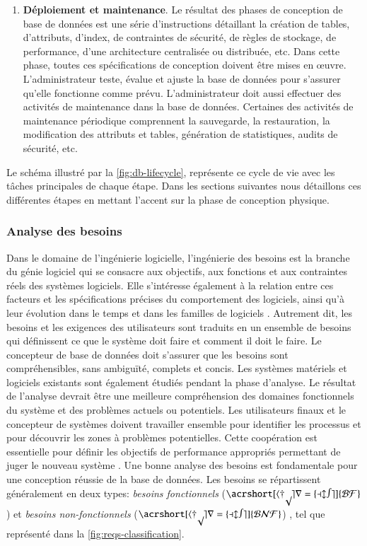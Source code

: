\begin{enumerate}
 \item \textbf{Déploiement et maintenance}. Le résultat des phases de conception de base de données est une série d'instructions détaillant la création de tables, d'attributs, d'index, de contraintes de sécurité, de règles de stockage, de performance, d'une architecture centralisée ou distribuée, etc. Dans cette phase, toutes ces spécifications de conception doivent être mises en œuvre. L'administrateur teste, évalue et ajuste la base de données pour s'assurer qu'elle fonctionne comme prévu. L'administrateur doit aussi effectuer des activités de maintenance dans la base de données. Certaines des activités de maintenance périodique comprennent la sauvegarde, la restauration, la modification des attributs et tables, génération de statistiques, audits de sécurité, etc.
\end{enumerate}

Le schéma illustré par la \ref{fig:db-lifecycle}, représente ce cycle de vie avec les tâches principales de chaque étape. Dans les sections suivantes nous détaillons ces différentes étapes en mettant l'accent sur la phase de conception physique.

\subsubsection{Analyse des besoins}
Dans le domaine de l'ingénierie logicielle, l'ingénierie des besoins est la branche du génie logiciel qui se consacre aux objectifs, aux fonctions et aux contraintes réels des systèmes logiciels. Elle s'intéresse également à la relation entre ces facteurs et les spécifications précises du comportement des logiciels, ainsi qu'à leur évolution dans le temps et dans les familles de logiciels \cite{Zave97}. Autrement dit, les besoins et les exigences des utilisateurs sont traduits en un ensemble de besoins qui définissent ce que le système doit faire et comment il doit le faire. Le concepteur de base de données doit s'assurer que les besoins sont compréhensibles, sans ambiguïté, complets et concis.
Les systèmes matériels et logiciels existants sont également étudiés pendant la phase d'analyse. Le résultat de l'analyse devrait être une meilleure compréhension des domaines fonctionnels du système et des problèmes actuels ou potentiels. Les utilisateurs finaux et le concepteur de systèmes doivent travailler ensemble pour identifier les processus et pour découvrir les zones à problèmes potentielles. Cette coopération est essentielle pour définir les objectifs de performance appropriés permettant de juger le nouveau système \cite{Coronel09}. Une bonne analyse des besoins est fondamentale pour une conception réussie de la base de données.
Les besoins se répartissent généralement en deux types: \textit{besoins fonctionnels} ($\mathcal{\acrshort[hyper=false]{BF}}$) et \textit{besoins non-fonctionnels} ($\mathcal{\acrshort[hyper=false]{BNF}}$) \cite{Zave97,Chung12,Ameller12}, tel que représenté dans la \ref{fig:reqs-classification}.

